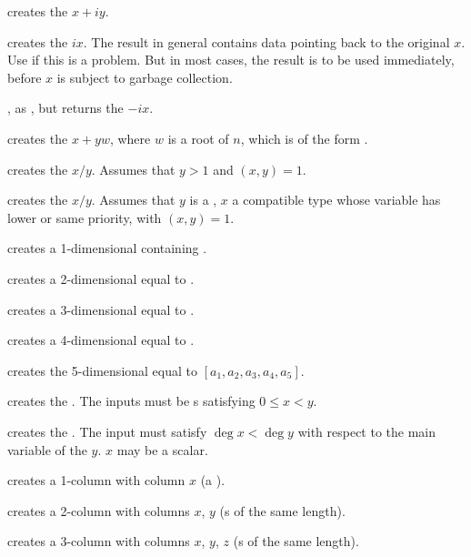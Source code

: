  creates the  $x + iy$.

 creates the  $ix$. The result in
general contains data pointing back to the original $x$. Use  if
this is a problem. But in most cases, the result is to be used immediately,
before $x$ is subject to garbage collection.

, as , but returns the 
$-ix$.

 creates the  $x + yw$,
where $w$ is a root of $n$, which is of the form .

 creates the  $x/y$. Assumes that
$y > 1$ and $(x,y) = 1$.

 creates the  $x/y$. Assumes
that $y$ is a , $x$ a compatible type whose variable has lower
or same priority, with $(x,y) = 1$.

 creates a 1-dimensional  containing .

 creates a 2-dimensional  equal to
\kbd{[x,y]}.

 creates a 3-dimensional 
equal to \kbd{[x,y,z]}.

 creates a 4-dimensional 
equal to \kbd{[x,y,z,t]}.

 creates the
5-dimensional  equal to $[a_1,a_2,a_3,a_4,a_5]$.

 creates the  .
The inputs must be s satisfying $0 \leq x < y$.

 creates the  .
The input must satisfy $\deg x < \deg y$ with respect to the main variable of
the  $y$. $x$ may be a scalar.

 creates a 1-column  with column $x$
(a ).

 creates a 2-column  with columns
$x$, $y$ (s of the same length).

 creates a 3-column  with columns
$x$, $y$, $z$ (s of the same length).

